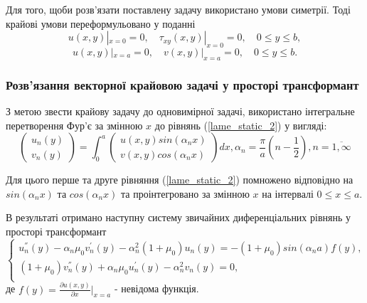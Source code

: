 Для того, щоби розв'язати поставлену задачу використано умови симетрії. Тоді крайові умови переформульовано у поданні
\begin{equation}\label{bound_4_static_2}
    u(x,y) |_{x=0} = 0, \quad \tau_{xy}(x,y) |_{x=0} =0, \quad 0 \le y \le b,
\end{equation}
\begin{equation}\label{bound_5_static_2}
    u(x,y) |_{x=a} = 0, \quad v(x,y) |_{x=a} = 0, \quad 0 \le y \le b.
\end{equation}

\subsubsection{Розв'язання векторної крайовою задачі у просторі трансформант}
З метою звести крайову задачу до одновимірної задачі, використано інтегральне перетворення Фур'є за змінною $x$ до рівнянь (\ref{lame_static_2}) у вигляді:
\begin{equation}\label{int_trans_static_2}
    \begin{pmatrix}
        u_n(y) \\
        v_n(y)
    \end{pmatrix} = \int_{0}^{a} 
    \begin{pmatrix}
        u(x,y) sin(\alpha_n x) \\
        v(x,y) cos(\alpha_n x)
    \end{pmatrix} dx, \alpha_n = \frac{\pi}{a} (n - \frac{1}{2}), n=\overline{1, \infty}
\end{equation}

Для цього перше та друге рівняння (\ref{lame_static_2}) помножено відповідно на $sin(\alpha_n x)$ та $cos(\alpha_n x)$ та проінтегровано за змінною $x$ на інтервалі $0 \le x \le a$.

В результаті отримано наступну систему звичайних диференціальних рівнянь у просторі трансформант
\begin{equation}\label{transf_static_2}
    \begin{cases}
        u_n^{''}(y) - \alpha_n \mu_0 v_n^{'}(y) - \alpha_n^2 (1 + \mu_0) u_n(y) = -(1 + \mu_0)sin(\alpha_n a) f(y), \\
        (1 + \mu_0) v_n^{''}(y) + \alpha_n \mu_0 u_n^{'}(y)  - \alpha_n^2 v_n(y) = 0, \\
    \end{cases}
\end{equation}
де $f(y) = \frac{\partial u(x,y)}{\partial x}|_{x=a}$ - невідома функція.

